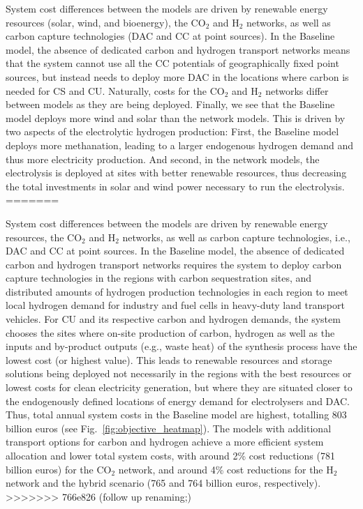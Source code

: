 \documentclass[twocolumn]{article}
\newcommand{\carbon}{CO$_2$}
\newcommand{\hydrogen}{H$_2$}
\begin{document}
System cost differences between the models are driven by renewable energy resources (solar, wind, and bioenergy), the \carbon{} and \hydrogen{} networks, as well as carbon capture technologies (DAC and CC at point sources).
In the Baseline model, the absence of dedicated carbon and hydrogen transport networks means that the system cannot use all the CC potentials of geographically fixed point sources, but instead needs to deploy more DAC in the locations where carbon is needed for CS and CU.
Naturally, costs for the \carbon{} and \hydrogen{} networks differ between models as they are being deployed.
Finally, we see that the Baseline model deploys more wind and solar than the network models. This is driven by two aspects of the electrolytic hydrogen production: First, the Baseline model deploys more methanation, leading to a larger endogenous hydrogen demand and thus more electricity production. And second, in the network models, the electrolysis is deployed at sites with better renewable resources, thus decreasing the total investments in solar and wind power necessary to run the electrolysis.
=======


System cost differences between the models are driven by renewable energy resources, the \carbon{} and \hydrogen{} networks, as well as carbon capture technologies, i.e., DAC and CC at point sources.
In the Baseline model, the absence of dedicated carbon and hydrogen transport networks requires the system to deploy carbon capture technologies in the regions with carbon sequestration sites, and distributed amounts of hydrogen production technologies in each region to meet local hydrogen demand for industry and fuel cells in heavy-duty land transport vehicles.
For CU and its respective carbon and hydrogen demands, the system chooses the sites where on-site production of carbon, hydrogen as well as the inputs and by-product outputs (e.g., waste heat) of the synthesis process have the lowest cost (or highest value). This leads to renewable resources and storage solutions being deployed not necessarily in the regions with the best resources or lowest costs for clean electricity generation, but where they are situated closer to the endogenously defined locations of energy demand for electrolysers and DAC.
Thus, total annual system costs in the Baseline model are highest, totalling \label{}803 billion euros (see Fig.~\ref{fig:objective_heatmap}). The models with additional transport options for carbon and hydrogen achieve a more efficient system allocation and lower total system costs, with around \label{}2\% cost reductions (\label{}781 billion euros) for the \carbon{} network, and around \label{}4\% cost reductions for the \hydrogen{} network and the hybrid scenario (\label{}765 and \label{}764 billion euros, respectively).
>>>>>>> 766e826 (follow up renaming;)
\end{document}
